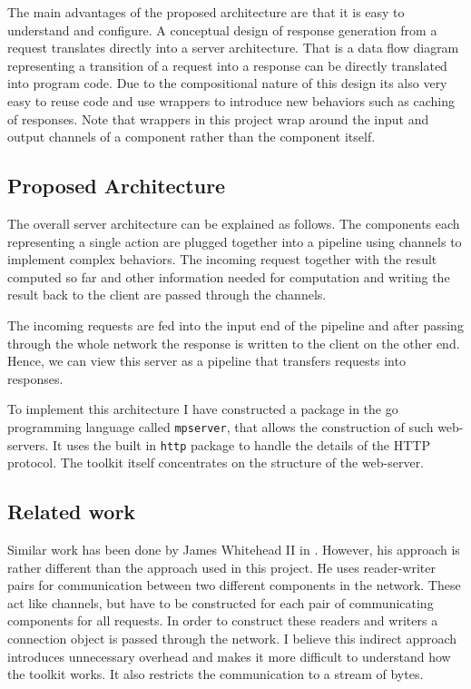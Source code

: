 \documentclass[12pt,a4paper]{article}
\begin{document}
The main advantages of the proposed architecture are that it is easy to understand
and configure. A conceptual design of response generation from a request translates 
directly into a server architecture. That is a data flow diagram representing a transition
of a request into a response can be directly translated into program code.
Due to the compositional nature of this design its also very easy to reuse code
and use wrappers to introduce new behaviors such as caching of responses.
Note that wrappers in this project wrap around the input and output channels
of a component rather than the component itself.

\subsection{Proposed Architecture}
The overall server architecture can be explained as follows.
The components each representing a single action are plugged together into 
a pipeline using channels to implement complex behaviors. The incoming
request together with the result computed so far and other 
information needed for computation and writing the result back to the client
are passed through the channels.

The incoming requests are fed into the input end of the pipeline and 
after passing through the whole network the response is written to the
client on the other end. Hence, we can view this server
as a pipeline that transfers requests into responses.

To implement this architecture I have constructed a package in the go programming 
language called \texttt{mpserver}, that allows the construction of such web-servers.
It uses the built in \texttt{http} package to handle the details of
the HTTP \cite{http} protocol. The toolkit itself concentrates on the 
structure of the web-server.

\subsection{Related work}
Similar work has been done by James Whitehead II in \cite{whitehead}.
However, his approach is rather different than the approach used 
in this project. He uses reader-writer pairs for communication between
two different components in the network. These act like channels, but
have to be constructed for each pair of communicating components
for all requests.
In order to construct these readers and writers a connection object is 
passed through the network.
I believe this indirect approach introduces unnecessary overhead and 
makes it more difficult to understand how the toolkit works.
It also restricts the communication to a stream of bytes.
\end{document}
